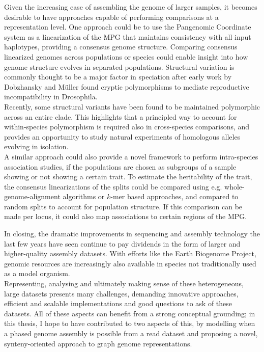 Given the increasing ease of assembling the genome of larger samples, %
it becomes desirable to have approaches capable of performing comparisons at a representation level.
One approach could be to use the Pangenomic Coordinate system as a linearization of the MPG that maintains consistency with all input haplotypes, providing a consensus genome structure.
Comparing consensus linearized genomes across populations or species could enable insight into how genome structure evolves in separated populations.
Structural variation is commonly thought to be a major factor in speciation after early work by Dobzhansky and Müller found cryptic polymorphisms to mediate reproductive incompatibility in Drosophila\cite{dobzhansky34, orr96}.\\
Recently, some structural variants have been found to be maintained polymorphic across an entire clade\cite{knief24}.
This highlights that a principled way to account for within-species polymorphism is required also in cross-species comparisons, and provides an opportunity to study natural experiments of homologous alleles evolving in isolation.\\
A similar approach could also provide a novel framework to perform intra-species association studies, if the populations are chosen as subgroups of a sample showing or not showing a certain trait.
To estimate the heritability of the trait, the consensus linearizations of the splits could be compared using e.g. whole-genome-alignment algorithms or $k$-mer based approaches, and compared to random splits to account for population structure.
If this comparison can be made per locus, it could also map associations to certain regions of the MPG. %


In closing, the dramatic improvements in sequencing and assembly technology the last few years have seen continue to pay dividends in the form of larger and higher-quality assembly datasets.
With efforts like the Earth Biogenome Project, genomic resources are increasingly also available in species not traditionally used as a model organism.\\
Representing, analysing and ultimately making sense of these heterogeneous, large datasets presents many challenges, demanding innovative approaches, efficient and scalable implementations and good questions to ask of these datasets.
All of these aspects can benefit from a strong conceptual grounding; in this thesis, I hope to have contributed to two aspects of this, by modelling when a phased genome assembly is possible from a read dataset and proposing a novel, synteny-oriented approach to graph genome representations.

